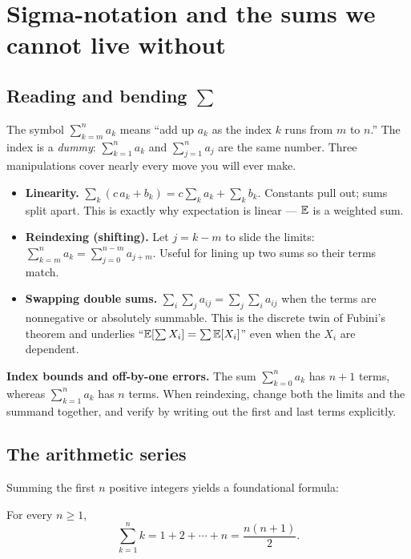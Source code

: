 \section{Sigma-notation and the sums we cannot live without}
\label{ch39:sums}

\subsection{Reading and bending $\sum$}

The symbol $\sum_{k=m}^{n} a_k$ means ``add up $a_k$ as the index $k$ runs
from $m$ to $n$.'' The index is a \emph{dummy}: $\sum_{k=1}^n a_k$ and
$\sum_{j=1}^n a_j$ are the same number. Three manipulations cover nearly every
move you will ever make.

\begin{itemize}
  \item \textbf{Linearity.} $\displaystyle \sum_k (c\,a_k + b_k) = c\sum_k a_k
        + \sum_k b_k$. Constants pull out; sums split apart. This is exactly
        why expectation is linear --- $\operatorname{\mathbb{E}}$ is a weighted sum.
  \item \textbf{Reindexing (shifting).} Let $j = k - m$ to slide the limits:
        $\sum_{k=m}^{n} a_k = \sum_{j=0}^{n-m} a_{j+m}$. Useful for lining up
        two sums so their terms match.
  \item \textbf{Swapping double sums.} $\sum_{i}\sum_{j} a_{ij} =
        \sum_{j}\sum_{i} a_{ij}$ when the terms are nonnegative or absolutely
        summable. This is the discrete twin of Fubini's theorem and underlies
        ``$\operatorname{\mathbb{E}}[\sum X_i] = \sum \operatorname{\mathbb{E}}[X_i]$'' even when the $X_i$ are dependent.
\end{itemize}

\begin{trapbox}
\textbf{Index bounds and off-by-one errors.} The sum
$\sum_{k=0}^{n} a_k$ has $n+1$ terms, whereas $\sum_{k=1}^{n} a_k$ has $n$ terms.
When reindexing, change both the limits and the summand together, and verify
by writing out the first and last terms explicitly.
\end{trapbox}

\subsection{The arithmetic series}

Summing the first $n$ positive integers yields a foundational formula:

\begin{proposition}
\label{ch39:gauss}
For every $n \ge 1$,
\[
  \sum_{k=1}^{n} k = 1 + 2 + \cdots + n = \frac{n(n+1)}{2}.
\]
\end{proposition}

